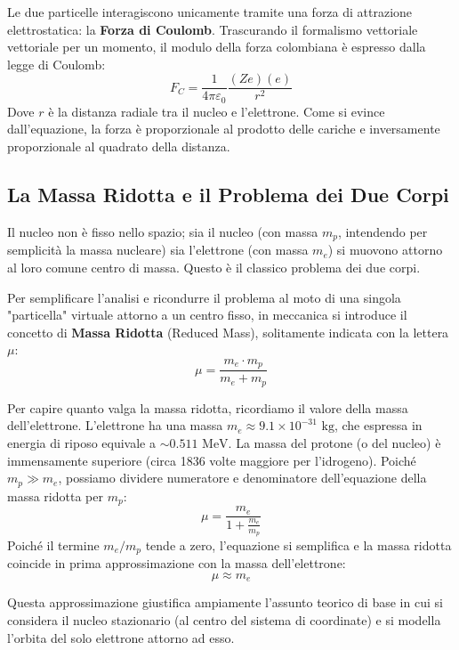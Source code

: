 Le due particelle interagiscono unicamente tramite una forza di attrazione elettrostatica: la \textbf{Forza di Coulomb}. Trascurando il formalismo vettoriale vettoriale per un momento, il modulo della forza colombiana è espresso dalla legge di Coulomb:
\begin{equation}
F_C = \frac{1}{4\pi\varepsilon_0} \frac{(Ze)(e)}{r^2}
\end{equation}
Dove $r$ è la distanza radiale tra il nucleo e l'elettrone. Come si evince dall'equazione, la forza è proporzionale al prodotto delle cariche e inversamente proporzionale al quadrato della distanza.

\subsection{La Massa Ridotta e il Problema dei Due Corpi}

Il nucleo non è fisso nello spazio; sia il nucleo (con massa $m_p$, intendendo per semplicità la massa nucleare) sia l'elettrone (con massa $m_e$) si muovono attorno al loro comune centro di massa. Questo è il classico problema dei due corpi.

Per semplificare l'analisi e ricondurre il problema al moto di una singola "particella" virtuale attorno a un centro fisso, in meccanica si introduce il concetto di \textbf{Massa Ridotta} (Reduced Mass), solitamente indicata con la lettera $\mu$:
\begin{equation}
\mu = \frac{m_e \cdot m_p}{m_e + m_p}
\end{equation}

Per capire quanto valga la massa ridotta, ricordiamo il valore della massa dell'elettrone. L'elettrone ha una massa $m_e \approx 9.1 \times 10^{-31} \text{ kg}$, che espressa in energia di riposo equivale a $\sim 0.511 \text{ MeV}$. La massa del protone (o del nucleo) è immensamente superiore (circa 1836 volte maggiore per l'idrogeno).
Poiché $m_p \gg m_e$, possiamo dividere numeratore e denominatore dell'equazione della massa ridotta per $m_p$:
\begin{equation}
\mu = \frac{m_e}{1 + \frac{m_e}{m_p}}
\end{equation}
Poiché il termine $m_e/m_p$ tende a zero, l'equazione si semplifica e la massa ridotta coincide in prima approssimazione con la massa dell'elettrone:
\begin{equation}
\mu \approx m_e
\end{equation}

Questa approssimazione giustifica ampiamente l'assunto teorico di base in cui si considera il nucleo stazionario (al centro del sistema di coordinate) e si modella l'orbita del solo elettrone attorno ad esso.

